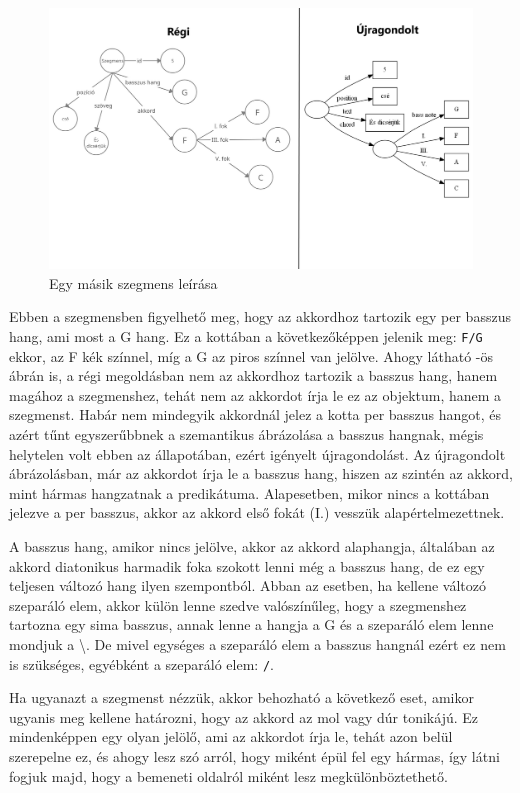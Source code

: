\begin{figure}[h]
	\includegraphics[scale=0.22]{images/misc/comparison_graph_3.jpg}
	\caption{Egy másik szegmens leírása}
	\label{fig:graph3}
\end{figure}

Ebben a szegmensben figyelhető meg, hogy az akkordhoz tartozik egy per basszus hang, ami most a G hang. Ez a kottában a következőképpen jelenik meg: \texttt{F/G} ekkor, az F kék színnel, míg a G az piros színnel van jelölve. Ahogy látható -ös ábrán is, a régi megoldásban nem az akkordhoz tartozik a basszus hang, hanem magához a szegmenshez, tehát nem az akkordot írja le ez az objektum, hanem a szegmenst. Habár nem mindegyik akkordnál jelez a kotta per basszus hangot, és azért tűnt egyszerűbbnek a szemantikus ábrázolása a basszus hangnak, mégis helytelen volt ebben az állapotában, ezért igényelt újragondolást. Az újragondolt ábrázolásban, már az akkordot írja le a basszus hang, hiszen az szintén az akkord, mint hármas hangzatnak a predikátuma. Alapesetben, mikor nincs a kottában jelezve a per basszus, akkor az akkord első fokát (I.) vesszük alapértelmezettnek.

A basszus hang, amikor nincs jelölve, akkor az akkord alaphangja, általában az akkord diatonikus harmadik foka szokott lenni még a basszus hang, de ez egy teljesen változó hang ilyen szempontból. Abban az esetben, ha kellene változó szeparáló elem, akkor külön lenne szedve valószínűleg, hogy a szegmenshez tartozna egy sima basszus, annak lenne a hangja a G és a szeparáló elem lenne mondjuk a \textbackslash. De mivel egységes a szeparáló elem a basszus hangnál ezért ez nem is szükséges, egyébként a szeparáló elem: \texttt{/}.

Ha ugyanazt a szegmenst nézzük, akkor behozható a következő eset, amikor ugyanis meg kellene határozni, hogy az akkord az mol vagy dúr tonikájú. Ez mindenképpen egy olyan jelölő, ami az akkordot írja le, tehát azon belül szerepelne ez, és ahogy lesz szó arról, hogy miként épül fel egy hármas, így látni fogjuk majd, hogy a bemeneti oldalról miként lesz megkülönböztethető.

